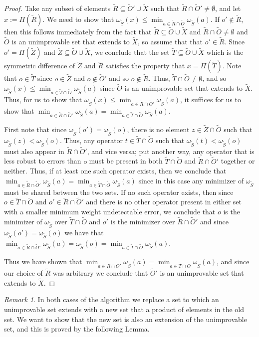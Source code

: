 \documentclass[12pt]{amsbook}
\theoremstyle{plain}
\theoremstyle{definition}
\theoremstyle{remark}
\newtheorem{remark}{Remark}
\newcommand{\set}{\tilde}
\newcommand{\om}{\omega}
\begin{document}
\begin{proof}
Take any subset of elements $\set R\subseteq\set O'\cup\set X$ such that $\set R\cap\set O'\ne\emptyset$, and let $x := \Pi(\set R)$.  We need to show that $\om_{\set S}(x) \le \min_{a\in\set R\cap\set O}\om_{\set S}(a)$.  If $o'\notin\set R$, then this follows immediately from the fact that $\set R\subseteq\set O\cup \set X$ and $\set R\cap\set O\ne\emptyset$ and $\set O$ is an unimprovable set that extends to $\set X$, so assume that that $o'\in\set R$.  Since $o'=\Pi(\set Z)$ and $\set Z\subseteq\set O\cup\set X$, we conclude that the set $\set T\subseteq\set O\cup\set X$ which is the symmetric difference of $\set Z$ and $\set R$ satisfies the property that $x=\Pi(\set T)$.  Note that $o\in\set T$ since $o\in \set Z$ and $o\notin \set O'$ and so $o\notin \set R$.  Thus, $\set T \cap\set O\ne\emptyset$, and so $\om_{\set S}(x)\le \min_{a\in\set T\cap\set O}\om_{\set S}(a)$ since $\set O$ is an unimprovable set that extends to $\set X$.  Thus, for us to show that $\om_{\set S}(x) \le \min_{a\in\set R\cap\set O'}\om_{\set S}(a)$, it suffices for us to show that $\min_{a\in\set R\cap\set O'}\om_{\set S}(a)=\min_{a\in\set T\cap\set O}\om_{\set S}(a)$.

First note that since $\om_{\set S}(o')=\om_{\set S}(o)$, there is no element $z\in\set Z\cap\set O$ such that $\om_{\set S}(z)<\om_{\set S}(o)$.  Thus, any operator $t\in\set T\cap\set O$ such that $\om_{\set S}(t)<\om_{\set S}(o)$ must also appear in $\set R\cap\set O'$, and vice versa;  put another way, any operator that is less robust to errors than $o$ must be present in both $\set T\cap\set O$ and $\set R\cap\set O'$ together or neither.  Thus, if at least one such operator exists, then we conclude that $\min_{a\in\set R\cap\set O'}\om_{\set S}(a)=\min_{a\in\set T\cap\set O}\om_{\set S}(a)$ since in this case any minimizer of $\om_{\set S}$ must be shared between the two sets.  If no such operator exists, then since $o\in\set T\cap\set O$ and $o'\in\set R\cap\set O'$ and there is no other operator present in either set with a smaller minimum weight undetectable error, we conclude that $o$ is the minimizer of $\om_{\set S}$ over $\set T\cap\set O$ and $o'$ is the minimizer over $\set R\cap\set O'$ and since $\om_{\set S}(o')=\om_{\set S}(o)$ we have that $\min_{a\in\set R\cap\set O'}\om_{\set S}(a)=\om_{\set S}(o)=\min_{a\in\set T\cap\set O}\om_{\set S}(a)$.

Thus we have shown that $\min_{a\in\set R\cap\set O'}\om_{\set S}(a)=\min_{a\in\set T\cap\set O}\om_{\set S}(a)$, and since our choice of $\set R$ was arbitrary we conclude that $\set O'$ is an unimprovable set that extends to $\set X$.
\end{proof}
\begin{remark}
In both cases of the algorithm we replace a set to which an unimprovable set extends with a new set that a product of elements in the old set.  We want to show that the new set is also an extension of the unimprovable set, and this is proved by the following Lemma.
\end{remark}
\end{document}
